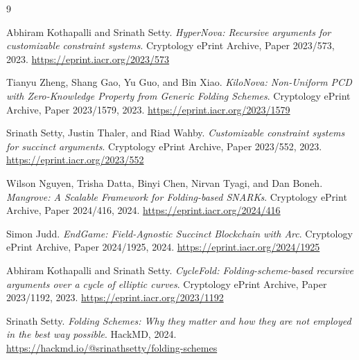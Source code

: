 \documentclass[11pt,a4paper]{article}
\theoremstyle{plain}
\theoremstyle{definition}
\begin{document}
\begin{thebibliography}{9}

Abhiram Kothapalli and Srinath Setty.
\textit{{HyperNova}: Recursive arguments for customizable constraint systems}.
Cryptology {ePrint} Archive, Paper 2023/573, 2023.
\url{https://eprint.iacr.org/2023/573}

Tianyu Zheng, Shang Gao, Yu Guo, and Bin Xiao.
\textit{{KiloNova}: Non-Uniform {PCD} with Zero-Knowledge Property from Generic Folding Schemes}.
Cryptology {ePrint} Archive, Paper 2023/1579, 2023.
\url{https://eprint.iacr.org/2023/1579}

Srinath Setty, Justin Thaler, and Riad Wahby.
\textit{Customizable constraint systems for succinct arguments}.
Cryptology {ePrint} Archive, Paper 2023/552, 2023.
\url{https://eprint.iacr.org/2023/552}

Wilson Nguyen, Trisha Datta, Binyi Chen, Nirvan Tyagi, and Dan Boneh.
\textit{Mangrove: A Scalable Framework for Folding-based {SNARKs}}.
Cryptology {ePrint} Archive, Paper 2024/416, 2024.
\url{https://eprint.iacr.org/2024/416}

Simon Judd.
\textit{{EndGame}: Field-Agnostic Succinct Blockchain with Arc}.
Cryptology {ePrint} Archive, Paper 2024/1925, 2024.
\url{https://eprint.iacr.org/2024/1925}

Abhiram Kothapalli and Srinath Setty.
\textit{{CycleFold}: Folding-scheme-based recursive arguments over a cycle of elliptic curves}.
Cryptology {ePrint} Archive, Paper 2023/1192, 2023.
\url{https://eprint.iacr.org/2023/1192}

Srinath Setty.
\textit{Folding Schemes: Why they matter and how they are not employed in the best way possible}.
HackMD, 2024.
\url{https://hackmd.io/@srinathsetty/folding-schemes}

\end{thebibliography}
\end{document}

